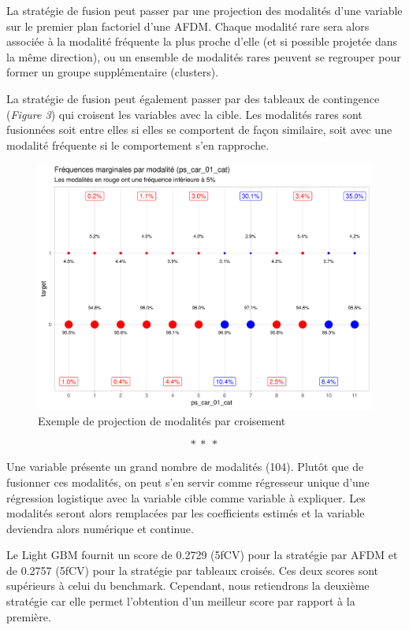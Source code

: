 \documentclass[french]{article}
\begin{document}
\begin{multicols}{2}
La stratégie de fusion peut passer par une projection des modalités d'une variable sur le premier plan factoriel d'une AFDM. Chaque modalité rare sera alors associée à la modalité fréquente la plus proche d'elle (et si possible projetée dans la même direction), ou un ensemble de modalités rares peuvent se regrouper pour former un groupe supplémentaire (clusters).

La stratégie de fusion peut également passer par des tableaux de contingence (\emph{Figure 3}) qui croisent les variables avec la cible. Les modalités rares sont fusionnées soit entre elles si elles se comportent de façon similaire, soit avec une modalité fréquente si le comportement s'en rapproche.

\begin{figure}[H] \centering
  \includegraphics[width = \columnwidth]{img/ex_tabc}
  \caption{Exemple de projection de modalités par croisement}
\end{figure}

\[ * \ * \ * \]

Une variable présente un grand nombre de modalités (104). Plutôt que de fusionner ces modalités, on peut s'en servir comme régresseur unique d'une régression logistique avec la variable cible comme variable à expliquer. Les modalités seront alors remplacées par les coefficients estimés et la variable deviendra alors numérique et continue.

Le Light GBM fournit un score de 0.2729 (5fCV) pour la stratégie par AFDM et de 0.2757 (5fCV) pour la stratégie par tableaux croisés. Ces deux scores sont supérieurs à celui du benchmark. Cependant, nous retiendrons la deuxième stratégie car elle permet l'obtention d'un meilleur score par rapport à la première.


\end{multicols}
\end{document}
